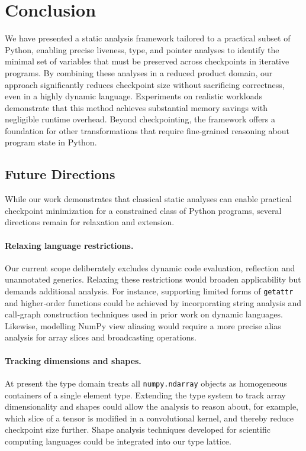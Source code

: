\section{Conclusion}
\label{sec:conclusion}

We have presented a static analysis framework tailored to a practical subset of Python, enabling precise liveness, type, and pointer analyses to identify the minimal set of variables that must be preserved across checkpoints in iterative programs. By combining these analyses in a reduced product domain, our approach significantly reduces checkpoint size without sacrificing correctness, even in a highly dynamic language. Experiments on realistic workloads demonstrate that this method achieves substantial memory savings with negligible runtime overhead. Beyond checkpointing, the framework offers a foundation for other transformations that require fine-grained reasoning about program state in Python.

\subsection{Future Directions}

While our work demonstrates that classical static analyses can enable practical checkpoint minimization for a constrained class of Python programs, several directions remain for relaxation and extension.

\paragraph{Relaxing language restrictions.} Our current scope deliberately excludes dynamic code evaluation, reflection and unannotated generics. Relaxing these restrictions would broaden applicability but demands additional analysis. For instance, supporting limited forms of \texttt{getattr} and higher‑order functions could be achieved by incorporating string analysis and call‑graph construction techniques used in prior work on dynamic languages. Likewise, modelling NumPy view aliasing would require a more precise alias analysis for array slices and broadcasting operations.

\paragraph{Tracking dimensions and shapes.} At present the type domain treats all \texttt{numpy.ndarray} objects as homogeneous containers of a single element type. Extending the type system to track array dimensionality and shapes could allow the analysis to reason about, for example, which slice of a tensor is modified in a convolutional kernel, and thereby reduce checkpoint size further. Shape analysis techniques developed for scientific computing languages could be integrated into our type lattice.

